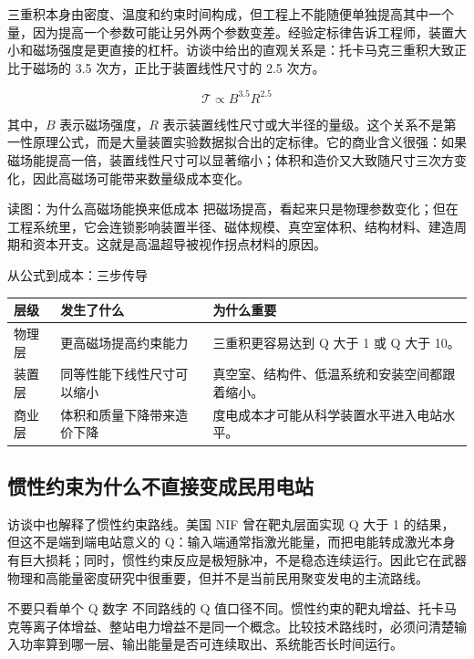 \documentclass[a4paper]{article}
\begin{document}
三重积本身由密度、温度和约束时间构成，但工程上不能随便单独提高其中一个量，因为提高一个参数可能让另外两个参数变差。经验定标律告诉工程师，装置大小和磁场强度是更直接的杠杆。访谈中给出的直观关系是：托卡马克三重积大致正比于磁场的 3.5 次方，正比于装置线性尺寸的 2.5 次方。

\[
\mathcal{T}\propto B^{3.5}R^{2.5}
\]

其中，$B$ 表示磁场强度，$R$ 表示装置线性尺寸或大半径的量级。这个关系不是第一性原理公式，而是大量装置实验数据拟合出的定标律。它的商业含义很强：如果磁场能提高一倍，装置线性尺寸可以显著缩小；体积和造价又大致随尺寸三次方变化，因此高磁场可能带来数量级成本变化。

\begin{knowledgebox}{读图：为什么高磁场能换来低成本}
把磁场提高，看起来只是物理参数变化；但在工程系统里，它会连锁影响装置半径、磁体规模、真空室体积、结构材料、建造周期和资本开支。这就是高温超导被视作拐点材料的原因。
\end{knowledgebox}

\begin{knowledgebox}{从公式到成本：三步传导}
\begin{tabularx}{\textwidth}{p{}p{}X}
\toprule
层级 & 发生了什么 & 为什么重要 \\
\midrule
物理层 & 更高磁场提高约束能力 & 三重积更容易达到 Q 大于 1 或 Q 大于 10。 \\
装置层 & 同等性能下线性尺寸可以缩小 & 真空室、结构件、低温系统和安装空间都跟着缩小。 \\
商业层 & 体积和质量下降带来造价下降 & 度电成本才可能从科学装置水平进入电站水平。 \\
\bottomrule
\end{tabularx}
\end{knowledgebox}

\subsection{惯性约束为什么不直接变成民用电站}

访谈中也解释了惯性约束路线。美国 NIF 曾在靶丸层面实现 Q 大于 1 的结果，但这不是端到端电站意义的 Q：输入端通常指激光能量，而把电能转成激光本身有巨大损耗；同时，惯性约束反应是极短脉冲，不是稳态连续运行。因此它在武器物理和高能量密度研究中很重要，但并不是当前民用聚变发电的主流路线。

\begin{warningbox}{不要只看单个 Q 数字}
不同路线的 Q 值口径不同。惯性约束的靶丸增益、托卡马克等离子体增益、整站电力增益不是同一个概念。比较技术路线时，必须问清楚输入功率算到哪一层、输出能量是否可连续取出、系统能否长时间运行。
\end{warningbox}
\end{document}
